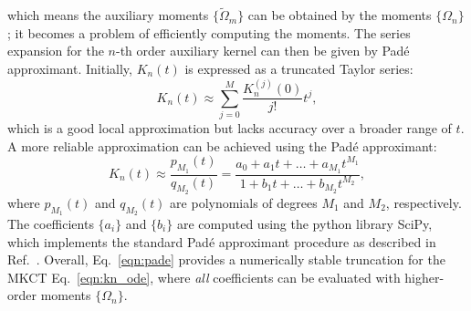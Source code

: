which means the auxiliary moments $\{\tilde{\Omega}_m\}$ can be obtained by the moments $\{\Omega_n\}$; it becomes a problem of efficiently computing the moments. The series expansion for the $n$-th order auxiliary kernel can then be given by Pad\'{e} approximant. Initially, $K_n(t)$ is expressed as a truncated Taylor series:
\begin{equation}
    K_n(t) \approx \sum_{j=0}^{M} \frac{K_n^{(j)}(0)}{j!} t^j,
\end{equation}
which is a good local approximation but lacks accuracy over a broader range of $t$. A more reliable approximation can be achieved using the Pad\'{e} approximant: 
\begin{equation}\label{eqn:pade}
    K_n(t) \approx \frac{p_{M_1}(t)}{q_{M_2}(t)} = \frac{a_0 + a_1 t + \dots + a_{M_1} t^{M_1}}{1 + b_1 t + \dots + b_{M_2} t^{M_2}},
\end{equation}
where $ p_{M_1}(t)$ and $q_{M_2}(t)$ are polynomials of degrees $M_1$ and $M_2$, respectively. The coefficients $\{a_i\}$ and $\{b_i\}$ are computed using the python library SciPy, which implements the standard Pad\'{e} approximant procedure as described in Ref.~\cite{Baker1996pade}. Overall, Eq.~\ref{eqn:pade} provides a numerically stable truncation for the MKCT Eq.~\ref{eqn:kn_ode}, where \emph{all} coefficients can be evaluated with higher-order moments $\{ \Omega_n \}$.
